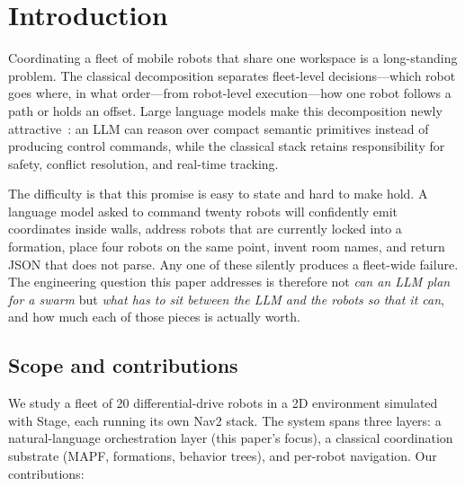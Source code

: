 \documentclass[10pt,twocolumn]{article}
\newcommand{\pending}[1]{\textcolor{blue}{\small[\textbf{PENDING RESULTS:} #1]}}
\begin{document}
\begin{abstract}
\pending{This draft fixes the system description and the experimental design.
E1 (hermetic planning accuracy) is populated across five local models, E2
(grounding and constraint ablation) across three, and E2c (hosted reference
sweep) across four; E3 remains unpopulated pending further runs.}
\end{abstract}

\section{Introduction}

Coordinating a fleet of mobile robots that share one workspace is a long-standing
problem. The classical decomposition separates fleet-level decisions---which
robot goes where, in what order---from robot-level execution---how one robot
follows a path or holds an offset. Large language models make this decomposition
newly attractive~\cite{saycan,codeaspolicies,progprompt,innermonologue}: an LLM
can reason over compact semantic primitives instead of producing control
commands, while the classical stack retains responsibility for safety, conflict
resolution, and real-time tracking.

The difficulty is that this promise is easy to state and hard to make hold. A
language model asked to command twenty robots will confidently emit coordinates
inside walls, address robots that are currently locked into a formation, place
four robots on the same point, invent room names, and return JSON that does not
parse. Any one of these silently produces a fleet-wide failure. The engineering
question this paper addresses is therefore not \emph{can an LLM plan for a
swarm} but \emph{what has to sit between the LLM and the robots so that it
can}, and how much each of those pieces is actually worth.

\subsection{Scope and contributions}

We study a fleet of 20 differential-drive robots in a 2D environment simulated
with Stage, each running its own Nav2 stack. The system spans three layers: a
natural-language orchestration layer (this paper's focus), a classical
coordination substrate (MAPF, formations, behavior trees), and per-robot
navigation. Our contributions:
\end{document}
